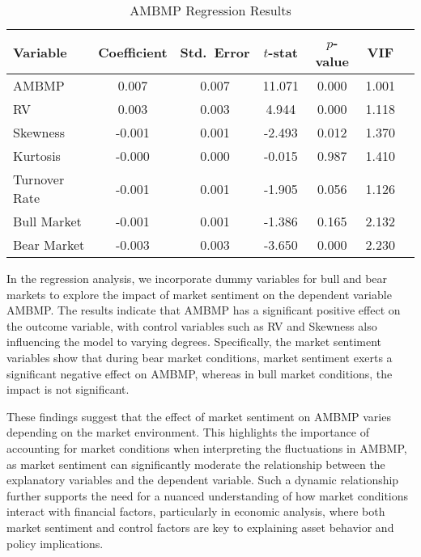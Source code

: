 \documentclass[preprint,12pt,authoryear]{elsarticle}
\begin{document}
\begin{table}[h!]
\centering
\caption{AMBMP Regression Results}
\label{tab:ambmp_regression_results}  %
\begin{tabular}{lcccccc}
\toprule
\textbf{Variable}      & \textbf{Coefficient} & \textbf{Std.\ Error} & \textbf{\(t\)-stat} & \textbf{\(p\)-value} & \textbf{VIF} \\
\midrule
AMBMP                  & 0.007               & 0.007                & 11.071              & 0.000                & 1.001        \\
RV                     & 0.003               & 0.003                & 4.944               & 0.000                & 1.118        \\
Skewness               & -0.001              & 0.001                & -2.493              & 0.012                & 1.370        \\
Kurtosis               & -0.000              & 0.000                & -0.015              & 0.987                & 1.410        \\
Turnover Rate          & -0.001              & 0.001                & -1.905              & 0.056                & 1.126        \\
Bull Market            & -0.001              & 0.001                & -1.386              & 0.165                & 2.132        \\
Bear Market            & -0.003              & 0.003                & -3.650              & 0.000                & 2.230        \\
\bottomrule
\end{tabular}
\end{table}


In the regression analysis, we incorporate dummy variables for bull and bear markets to explore the impact of market sentiment on the dependent variable AMBMP. The results indicate that AMBMP has a significant positive effect on the outcome variable, with control variables such as RV and Skewness also influencing the model to varying degrees. Specifically, the market sentiment variables show that during bear market conditions, market sentiment exerts a significant negative effect on AMBMP, whereas in bull market conditions, the impact is not significant.

These findings suggest that the effect of market sentiment on AMBMP varies depending on the market environment. This highlights the importance of accounting for market conditions when interpreting the fluctuations in AMBMP, as market sentiment can significantly moderate the relationship between the explanatory variables and the dependent variable. Such a dynamic relationship further supports the need for a nuanced understanding of how market conditions interact with financial factors, particularly in economic analysis, where both market sentiment and control factors are key to explaining asset behavior and policy implications.
\end{document}
